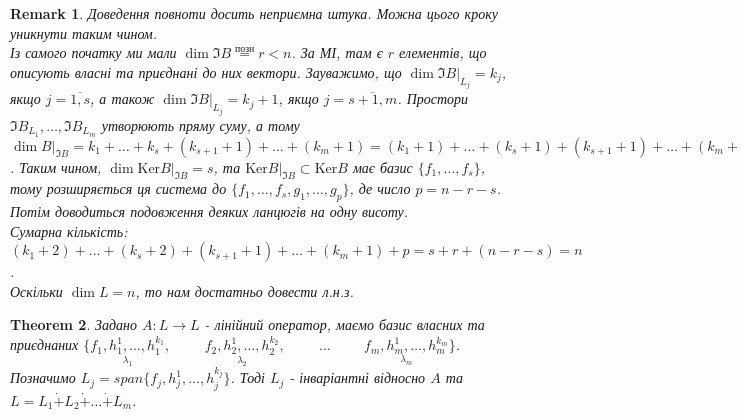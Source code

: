 \documentclass[a4paper, 10pt]{article}
\def\ker#1{\textrm{Ker} {#1}}
\theoremstyle{theoremdd}
\newtheorem{theorem}{Theorem}[subsection]
\theoremstyle{theoremdd}
\theoremstyle{theoremdd}
\theoremstyle{theoremdd}
\theoremstyle{theoremdd}
\theoremstyle{theoremdd}
\newtheorem{remark}[theorem]{Remark}
\theoremstyle{theoremdd}
\theoremstyle{theoremdd}
\begin{document}
\begin{remark}
Доведення повноти досить неприємна штука. Можна цього кроку уникнути таким чином.\\
Із самого початку ми мали $\dim \Im B \overset{\text{позн}}{=} r < n$. За МІ, там є $r$ елементів, що описують власні та приєднані до них вектори. Зауважимо, що $\dim \Im B|_{L_j} = k_j$, якщо $j = \overline{1,s}$, а також $\dim \Im B|_{L_j} = k_j + 1$, якщо $j = \overline{s+1,m}$. Простори $\Im B_{L_1},\dots, \Im B_{L_m}$ утворюють пряму суму, а тому $\dim B|_{\Im B} = k_1 + \dots + k_s + (k_{s+1}+1) + \dots + (k_m+1) = (k_1 + 1) + \dots + (k_s + 1) + (k_{s+1}+1) + \dots + (k_m+1) - s = r - s$. Таким чином, $\dim \ker B|_{\Im B} = s$, та $\ker B|_{\Im B} \subset \ker B$ має базис $\{f_1,\dots,f_s\}$, тому розширяється ця система до $\{f_1,\dots,f_s, g_1,\dots,g_p\}$, де число $p = n-r-s$.\\
Потім доводиться подовження деяких ланцюгів на одну висоту.\\
Сумарна кількість: $(k_1+2)+ \dots + (k_s+2) + (k_{s+1}+1) + \dots + (k_m+1) + p = s+r + (n-r-s) = n$.\\
Оскільки $\dim L = n$, то нам достатньо довести л.н.з.
\end{remark}

\begin{theorem}
Задано $A: L \to L$ - лінійний оператор, маємо базис власних та приєднаних $\{\underset{\lambda_1}{f_1, h_1^1, \dots ,h_1^{k_1}}, \hspace{1cm} \underset{\lambda_2}{f_2, h_2^1, \dots, h_2^{k_2}}, \hspace{1cm} \dots \hspace{1cm} \underset{\lambda_m}{f_m, h_m^{1}, \dots, h_m^{k_m}}\}$.\\
Позначимо $L_j = span\{f_j, h_j^1,\dots, h_j^{k_j}\}$. Тоді $L_j$ - інваріантні відносно $A$ та \\ 
$L = L_1 \dot{+} L_2 \dot{+} \dots \dot{+} L_m$.
\end{theorem}
\end{document}
